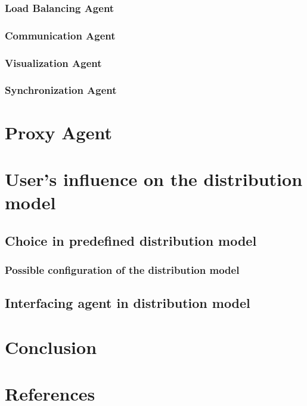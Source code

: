 \documentclass{article}
\begin{document}
\subsubsection{Load Balancing Agent}
\subsubsection{Communication Agent}
\subsubsection{Visualization Agent}
\subsubsection{Synchronization Agent}
\hfill

\section{Proxy Agent}
\hfill

\section{User's influence on the distribution model}
\subsection{Choice in predefined distribution model}
\subsubsection{Possible configuration of the distribution model}
\subsection{Interfacing agent in distribution model}
\hfill

\section{Conclusion}
\hfill

\section{References}
\hfill
\end{document}
